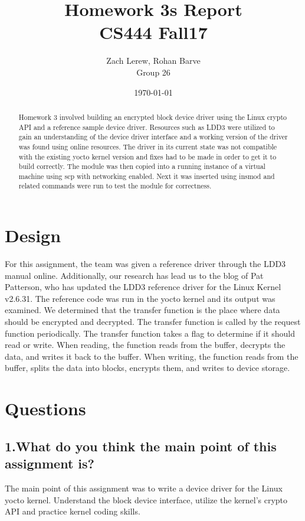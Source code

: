 \documentclass[onecolumn, draftclsnofoot,10pt, compsoc]{IEEEtran}
\title{Homework 3s Report\\\large CS444 Fall17}
\author{Zach Lerew, Rohan Barve\\\large Group 26}
\date{\today}
\begin{document}
  \maketitle

	\begin{titlingpage}
		\begin{abstract}
			\noindent Homework 3 involved building an encrypted block device driver using the Linux crypto API and a reference sample device driver.  Resources such as LDD3 were utilized to gain an understanding of the device driver interface and a working version of the driver was found using online resources. The driver in its current state was not compatible with the existing yocto kernel version and fixes had to be made in order to get it to build correctly. The module  was then copied into a running instance of a virtual machine using scp  with networking enabled. Next it was inserted using insmod and related commands were run to test the module for correctness.
     
		\end{abstract}
	\end{titlingpage}

  \clearpage
  \singlespace

	\section*{Design}
  For this assignment, the team was given a reference driver through the LDD3 manual online.
  Additionally, our research has lead us to the blog of Pat Patterson, who has updated the LDD3 reference driver for the Linux Kernel v2.6.31. \cite{pat}
  The reference code was run in the yocto kernel and its output was examined.
  We determined that the transfer function is the place where data should be encrypted and decrypted. The transfer function is called by the request function periodically.
  The transfer function takes a flag to determine if it should read or write.
  When reading, the function reads from the buffer, decrypts the data, and writes it back to the buffer.
  When writing, the function reads from the buffer, splits the data into blocks, encrypts them, and writes to device storage.

	\section*{Questions}
	\subsection*{1.What do you think the main point of this assignment is?}
	The main point of this assignment was to write a device driver for the Linux yocto kernel.
	Understand the block device interface, utilize the kernel's crypto API and practice kernel
	coding skills.
\end{document}
